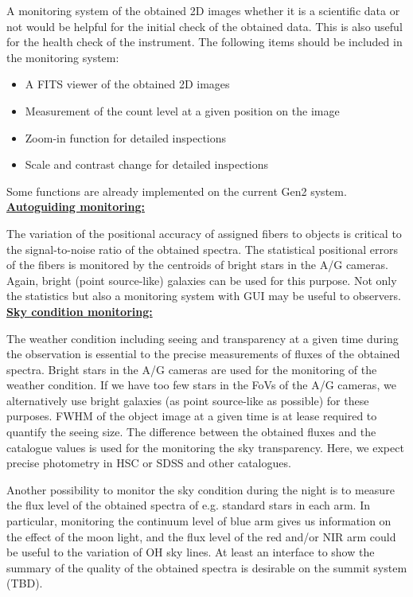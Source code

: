 \documentclass[a4paper]{article}
\begin{document}
A monitoring system of the obtained 2D images whether it is a scientific data or not would be helpful for the initial check of the obtained data. This is also useful for the health check of the instrument. The following items should be included in the monitoring system:\\

\begin{itemize}
\item A FITS viewer of the obtained 2D images
\item Measurement of the count level at a given position on the image
\item Zoom-in function for detailed inspections
\item Scale and contrast change for detailed inspections
\end{itemize}

Some functions are already implemented on the current Gen2 system.\\

\noindent \underline{\textbf{Autoguiding monitoring:}}
\vspace{5pt}

The variation of the positional accuracy of assigned fibers to objects
is critical to the signal-to-noise ratio of the obtained spectra. The
statistical positional errors of the fibers is monitored by the
centroids of bright stars in the A/G cameras. Again, bright (point
source-like) galaxies can be used for this purpose. Not only the
statistics but also a monitoring system with GUI may be useful to
observers.\\

\noindent \underline{\textbf{Sky condition monitoring:}}
\vspace{5pt}

The weather condition including seeing and transparency at a given
time during the observation is essential to the precise measurements
of fluxes of the obtained spectra. Bright stars in the A/G cameras are
used for the monitoring of the weather condition. If we have too few
stars in the FoVs of the A/G cameras, we alternatively use bright
galaxies (as point source-like as possible) for these purposes. FWHM
of the object image at a given time is at lease required to quantify
the seeing size. The difference between the obtained fluxes and the
catalogue values is used for the monitoring the sky
transparency. Here, we expect precise photometry in HSC or SDSS and
other catalogues.

Another possibility to monitor the sky condition during the night is
to measure the flux level of the obtained spectra of e.g. standard
stars in each arm. In particular, monitoring the continuum level of
blue arm gives us information on the effect of the moon light, and the
flux level of the red and/or NIR arm could be useful to the variation
of OH sky lines. At least an interface to show the summary of the
quality of the obtained spectra is desirable on the summit system
(TBD).\\
\end{document}
